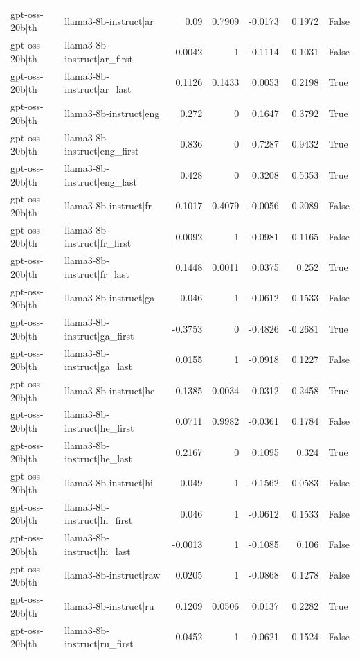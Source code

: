 \begin{table}
\begin{tabular}{l l r r r r l}
gpt-oss-20b|th & llama3-8b-instruct|ar & 0.09 & 0.7909 & -0.0173 & 0.1972 & False \\
gpt-oss-20b|th & llama3-8b-instruct|ar_first & -0.0042 & 1 & -0.1114 & 0.1031 & False \\
gpt-oss-20b|th & llama3-8b-instruct|ar_last & 0.1126 & 0.1433 & 0.0053 & 0.2198 & True \\
gpt-oss-20b|th & llama3-8b-instruct|eng & 0.272 & 0 & 0.1647 & 0.3792 & True \\
gpt-oss-20b|th & llama3-8b-instruct|eng_first & 0.836 & 0 & 0.7287 & 0.9432 & True \\
gpt-oss-20b|th & llama3-8b-instruct|eng_last & 0.428 & 0 & 0.3208 & 0.5353 & True \\
gpt-oss-20b|th & llama3-8b-instruct|fr & 0.1017 & 0.4079 & -0.0056 & 0.2089 & False \\
gpt-oss-20b|th & llama3-8b-instruct|fr_first & 0.0092 & 1 & -0.0981 & 0.1165 & False \\
gpt-oss-20b|th & llama3-8b-instruct|fr_last & 0.1448 & 0.0011 & 0.0375 & 0.252 & True \\
gpt-oss-20b|th & llama3-8b-instruct|ga & 0.046 & 1 & -0.0612 & 0.1533 & False \\
gpt-oss-20b|th & llama3-8b-instruct|ga_first & -0.3753 & 0 & -0.4826 & -0.2681 & True \\
gpt-oss-20b|th & llama3-8b-instruct|ga_last & 0.0155 & 1 & -0.0918 & 0.1227 & False \\
gpt-oss-20b|th & llama3-8b-instruct|he & 0.1385 & 0.0034 & 0.0312 & 0.2458 & True \\
gpt-oss-20b|th & llama3-8b-instruct|he_first & 0.0711 & 0.9982 & -0.0361 & 0.1784 & False \\
gpt-oss-20b|th & llama3-8b-instruct|he_last & 0.2167 & 0 & 0.1095 & 0.324 & True \\
gpt-oss-20b|th & llama3-8b-instruct|hi & -0.049 & 1 & -0.1562 & 0.0583 & False \\
gpt-oss-20b|th & llama3-8b-instruct|hi_first & 0.046 & 1 & -0.0612 & 0.1533 & False \\
gpt-oss-20b|th & llama3-8b-instruct|hi_last & -0.0013 & 1 & -0.1085 & 0.106 & False \\
gpt-oss-20b|th & llama3-8b-instruct|raw & 0.0205 & 1 & -0.0868 & 0.1278 & False \\
gpt-oss-20b|th & llama3-8b-instruct|ru & 0.1209 & 0.0506 & 0.0137 & 0.2282 & True \\
gpt-oss-20b|th & llama3-8b-instruct|ru_first & 0.0452 & 1 & -0.0621 & 0.1524 & False \\

\end{tabular}
\end{table}
